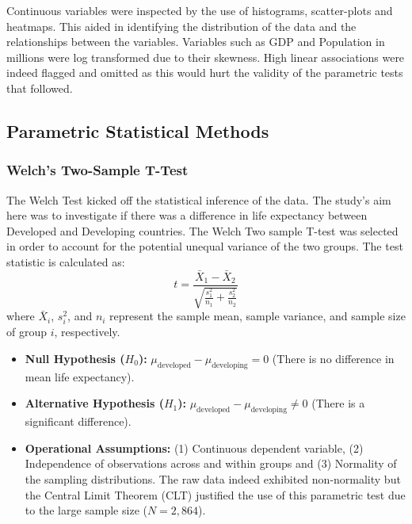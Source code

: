 \documentclass[3pt, a4paper]{article}
\begin{document}
Continuous variables were inspected by the use of histograms, scatter-plots and heatmaps. This aided in identifying the distribution of the data and the relationships between the variables. Variables such as GDP and Population in millions were log transformed due to their skewness. High linear associations were indeed flagged and omitted as this would hurt the validity of the parametric tests that followed.

\subsection{Parametric Statistical Methods}

\subsubsection{Welch's Two-Sample T-Test}
The Welch Test kicked off the statistical inference of the data. The study's aim here was to investigate if there was a difference in life expectancy between Developed and Developing countries. The Welch Two sample T-test was selected in order to account for the potential unequal variance of the two groups.  The test statistic is calculated as:
$$t = \frac{\bar{X}_1 - \bar{X}_2}{\sqrt{\frac{s_1^2}{n_1} + \frac{s_2^2}{n_2}}}$$
where $\bar{X}_i$, $s_i^2$, and $n_i$ represent the sample mean, sample variance, and sample size of group $i$, respectively. 
\begin{itemize}[noitemsep,topsep=0pt]
    \item \textbf{Null Hypothesis ($H_0$):} $\mu_{\text{developed}} - \mu_{\text{developing}} = 0$ (There is no difference in mean life expectancy).
    \item \textbf{Alternative Hypothesis ($H_1$):} $\mu_{\text{developed}} - \mu_{\text{developing}} \neq 0$ (There is a significant difference).
    \item \textbf{Operational Assumptions:} (1) Continuous dependent variable, (2) Independence of observations across and within groups and (3) Normality of the sampling distributions. The raw data indeed exhibited non-normality but the Central Limit Theorem (CLT) justified the use of this parametric test due to the large sample size ($N = 2,864$).
\end{itemize}
\end{document}
